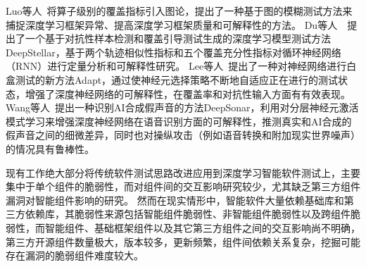 Luo等人~将算子级别的覆盖指标引入图论，提出了一种基于图的模糊测试方法来捕捉深度学习框架异常、提高深度学习框架质量和可解释性的方法。
Du等人~~提出了一个基于对抗性样本检测和覆盖引导测试生成的深度学习模型测试方法DeepStellar，基于两个轨迹相似性指标和五个覆盖充分性指标对循环神经网络（RNN）进行定量分析和可解释性研究。
Lee等人~提出了一种对神经网络进行白盒测试的新方法Adapt，通过使神经元选择策略不断地自适应正在进行的测试状态，增强了深度神经网络的可解释性，在覆盖率和对抗性输入方面有有效表现。
Wang等人~提出一种识别AI合成假声音的方法DeepSonar，利用对分层神经元激活模式学习来增强深度神经网络在语音识别方面的可解释性，推测真实和AI合成的假声音之间的细微差异，同时也对操纵攻击（例如语音转换和附加现实世界噪声）的情况具有鲁棒性。


现有工作绝大部分将传统软件测试思路改进应用到深度学习智能软件测试上，主要集中于单个组件的脆弱性，而对组件间的交互影响研究较少，尤其缺乏第三方组件漏洞对智能组件影响的研究。
然而在现实情形中，智能软件大量依赖基础库和第三方依赖库，其脆弱性来源包括智能组件脆弱性、非智能组件脆弱性以及跨组件脆弱性，而智能组件、基础框架组件以及其它第三方组件之间的交互影响尚不明确，第三方开源组件数量极大，版本较多，更新频繁，组件间依赖关系复杂，挖掘可能存在漏洞的脆弱组件难度较大。


























\begin{spacing}{1.3} %
	 \songti
	
	
	\vspace{11bp}
\end{spacing}
